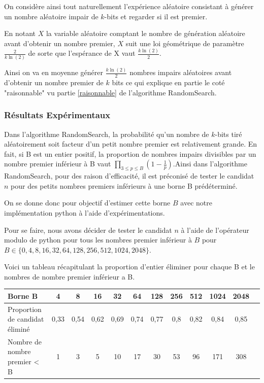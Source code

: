 On considère ainsi tout naturellement l’expérience aléatoire consistant à générer un nombre aléatoire impair de $k$-bits et regarder si il est premier.

En notant $X$ la variable aléatoire comptant le nombre de génération aléatoire avant d’obtenir un nombre premier, $X$ suit une loi géométrique de paramètre $\frac{2}{k\ln(2)}$ de sorte que l’espérance de X vaut $\frac{k\ln(2)}{2}$.


Ainsi on va en moyenne générer $\frac{k\ln(2)}{2}$ nombres impairs aléatoires avant d’obtenir un nombre premier de $k$ bits ce qui explique en partie le coté "raisonnable" vu partie \ref{raisonnable} de l'algorithme RandomSearch.

\subsubsection{Résultats Expérimentaux}
Dans l'algorithme RandomSearch, la probabilité qu'un nombre de $k$-bits tiré aléatoirement soit facteur d'un petit nombre premier est relativement grande. En fait, si B est un entier positif, la proportion de nombres impairs divisibles par un nombre premier inférieur à B vaut $\prod_{3\leq p \leq B} \left(1-\frac{1}{p}\right)$.Ainsi dans l'algorithme RandomSearch, pour des raison d'efficacité, il est préconisé de tester le candidat $n$ pour des petits nombres premiers inférieurs à une borne B prédéterminé.

On se donne donc pour objectif d'estimer cette borne $B$ avec notre implémentation python à l'aide d'expérimentations.

Pour se faire, nous avons décider de tester le candidat $n$ à l’aide de l’opérateur modulo de python pour tous les nombres premier inférieur à $B$ pour $B \in \{0,4,8,16,32,64,128,256,512,1024,2048\}.$

Voici un tableau récapitulant la proportion d’entier éliminer pour chaque B et le nombres de nombre premier inférieur a B.


\begin{tabular}{|l|c|c|c|c|c|c|c|c|c|c|c|}
    \hline
    Borne B & 4 & 8 & 16 & 32 & 64 & 128 & 256 & 512 & 1024 & 2048 \\
    \hline
    Proportion de candidat éliminé  & 0,33 & 0,54 & 0,62 & 0,69 & 0,74 & 0,77 & 0,8 & 0,82 & 0,84 & 0,85 \\
    \hline
    Nombre de nombre premier < B & 1 & 3 & 5 & 10 & 17 & 30 & 53 & 96 & 171 & 308 \\
    \hline
\end{tabular}



